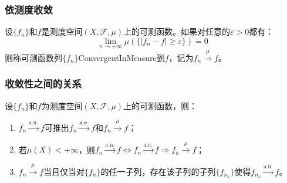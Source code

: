 \subsubsection{依测度收敛}
\begin{definition}
	设$\{f_n\}$和$f$是测度空间$(X,\mathscr{F},\mu)$上的可测函数。如果对任意的$\varepsilon>0$都有：
	\begin{equation*}
		\lim_{n\to+\infty}\mu(\{|f_n-f|\geqslant\varepsilon\})=0
	\end{equation*}
	则称可测函数列$\{f_n\}$\gls{ConvergentInMeasure}到$f$，记为$f_n\overset{\mu}{\longrightarrow}f$。
\end{definition}
\subsubsection{收敛性之间的关系}
\begin{theorem}\label{theo:a.e.a.u.mu}
	设$\{f_n\}$和$f$为测度空间$(X,\mathscr{F},\mu)$上的可测函数，则：
	\begin{enumerate}
		\item $f_n\overset{\text{a.u.}}{\longrightarrow}f$可推出$f_n\overset{\textbf{a.e.}}{\longrightarrow}f$和$f_n\overset{\mu}{\longrightarrow}f$；
		\item 若$\mu(X)<+\infty$，则$f_n\overset{\text{a.u.}}{\longrightarrow}f\iff f_n\overset{\text{a.e.}}{\longrightarrow}f\Rightarrow f_n\overset{\mu}{\longrightarrow}f$；
		\item $f_n\overset{\mu}{\longrightarrow}f$当且仅当对$\{f_n\}$的任一子列，存在该子列的子列$\{f_{n_k}\}$使得$f_{n_k}\overset{\text{a.u.}}{\longrightarrow}f$。
	\end{enumerate}
\end{theorem}
